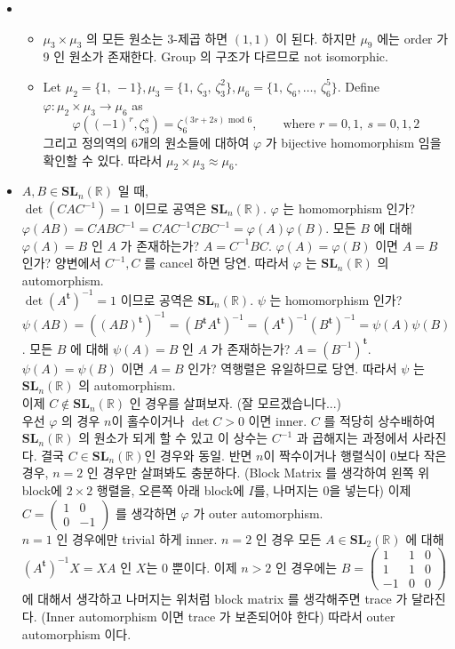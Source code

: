 \documentclass[12pt]{report}
\newcommand{\numl}[1]{\item[\large\textbf{\sffamily #1}]}
\newcommand{\num}[1]{\item[\textbf{\sffamily #1}]}
\newcommand{\bb}[1]{\mathbb{#1}}
\newcommand{\rmbf}[1]{\mathrm{\mathbf{#1}}}
\newcommand{\trans}{^{\mathrm{\mathbf{t}}}}
\begin{document}
\begin{itemize}
\numl{11.8.15}
	\begin{itemize}
		\num{(가)} $\mu_3\times\mu_3$ 의 모든 원소는 3-제곱 하면 $(1, 1)$ 이 된다. 하지만 $\mu_9$ 에는 order 가 9 인 원소가 존재한다. Group 의 구조가 다르므로 not isomorphic.
		\num{(나)} Let $\mu_2 = \{1,\, -1\}, \mu_3 = \{1,\, \zeta_3,\, \zeta_3^2\}, \mu_6 = \{1,\, \zeta_6, \dots,\, \zeta_6^5\}$. Define $\varphi : \mu_2\times\mu_3 \rightarrow \mu_6$ as $$\varphi((-1)^r, \zeta_3^s) = \zeta_6^{(3r+2s) \text{ mod } 6}, \qquad \text{where }r = 0, 1, \: s = 0, 1, 2$$ 그리고 정의역의 6개의 원소들에 대하여 $\varphi$ 가 bijective homomorphism 임을 확인할 수 있다. 따라서 $\mu_2\times\mu_3 \approx \mu_6$.
	\end{itemize}

\numl{11.9.12} $A, B\in \rmbf{SL}_n(\bb{R})$ 일 때, \\
$\det(CAC^{-1})=1$ 이므로 공역은 $\rmbf{SL}_n(\bb{R})$. $\varphi$ 는 homomorphism 인가? $\varphi(AB) = CABC^{-1} = CAC^{-1}CBC^{-1} = \varphi(A)\varphi(B)$. 모든 $B$ 에 대해 $\varphi(A)=B$ 인 $A$ 가 존재하는가? $A = C^{-1}BC$. $\varphi(A)=\varphi(B)$ 이면 $A=B$ 인가? 양변에서 $C^{-1}, C$ 를 cancel 하면 당연. 따라서 $\varphi$ 는 $\rmbf{SL}_n(\bb{R})$ 의 automorphism. \\
$\det(A\trans)^{-1} = 1$ 이므로 공역은 $\rmbf{SL}_n(\bb{R})$. $\psi$ 는 homomorphism 인가? $\psi(AB) = ((AB)\trans)^{-1} = (B\trans A\trans)^{-1} = (A\trans)^{-1}(B\trans)^{-1} = \psi(A)\psi(B)$. 모든 $B$ 에 대해 $\psi(A)=B$ 인 $A$ 가 존재하는가? $A = (B^{-1})\trans$. $\psi(A)=\psi(B)$ 이면 $A=B$ 인가? 역행렬은 유일하므로 당연. 따라서 $\psi$ 는 $\rmbf{SL}_n(\bb{R})$ 의 automorphism.\\ 이제 $C \notin \rmbf{SL}_n(\bb{R})$ 인 경우를 살펴보자. (잘 모르겠습니다...) \\
우선 $\varphi$ 의 경우 $n$이 홀수이거나 $\det C>0$ 이면 inner. $C$ 를 적당히 상수배하여 $\rmbf{SL}_n(\bb{R})$ 의 원소가 되게 할 수 있고 이 상수는 $C^{-1}$ 과 곱해지는 과정에서 사라진다. 결국 $C\in\rmbf{SL}_n(\bb{R})$인 경우와 동일. 반면 $n$이 짝수이거나 행렬식이 0보다 작은 경우, $n=2$ 인 경우만 살펴봐도 충분하다. (Block Matrix 를 생각하여 왼쪽 위 block에 $2\times 2$ 행렬을, 오른쪽 아래 block에 $I$를, 나머지는 0을 넣는다) 이제 $C = \left(
\begin{matrix}1 & 0 \\ 0 & -1\end{matrix}
\right)$ 를 생각하면 $\varphi$ 가 outer automorphism.\\
$n=1$ 인 경우에만 trivial 하게 inner. $n=2$ 인 경우 모든 $A \in \rmbf{SL}_2(\bb{R})$ 에 대해 $(A\trans)^{-1}X=XA$ 인 $X$는 0 뿐이다. 이제 $n>2$ 인 경우에는 $B = \left( \begin{matrix}
	1 & 1 & 0 \\ 1 & 1 & 0 \\ -1 & 0 & 0
\end{matrix} \right)$ 에 대해서 생각하고 나머지는 위처럼 block matrix 를 생각해주면 trace 가 달라진다. (Inner automorphism 이면 trace 가 보존되어야 한다) 따라서 outer automorphism 이다. 


\end{itemize}
\end{document}
